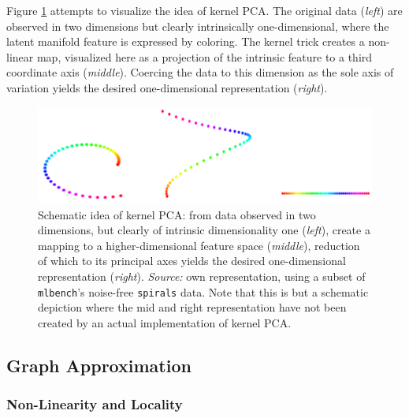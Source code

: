 Figure \ref{fig:spirals} attempts to visualize the idea of kernel PCA.
The original data (\textit{left}) are observed in two dimensions but clearly 
intrinsically one-dimensional, where the latent manifold feature is expressed by 
coloring. 
The kernel trick creates a non-linear map, visualized here as a projection of 
the intrinsic feature to a third coordinate axis (\textit{middle}). 
Coercing the data to this dimension as the sole axis of variation yields the 
desired one-dimensional representation (\textit{right}). 

\begin{figure}[H]
  \centering
  \includegraphics[width = \textwidth]{figures/spirals}
  \caption[Schematic idea of kernel PCA]{Schematic idea of kernel PCA: from data
  observed in two dimensions, but clearly of intrinsic dimensionality one 
  (\textit{left}), create a mapping to a higher-dimensional feature space 
  (\textit{middle}), reduction of which to its principal axes yields the desired 
  one-dimensional representation (\textit{right}).
  \textit{Source:} own representation, using a subset of \texttt{mlbench}'s 
  noise-free \texttt{spirals} data. Note that this is but a schematic depiction 
  where the mid and right representation have not been created by an actual 
  implementation of kernel PCA.}
  \label{fig:spirals}
\end{figure}


\subsection{Graph Approximation}
\label{lgb-properties}


\subsubsection{Non-Linearity and Locality}
\label{nonlin-local}

